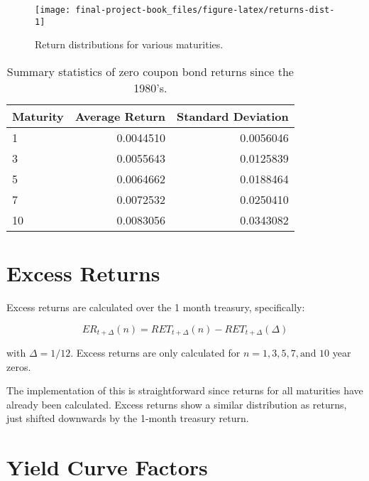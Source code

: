 \documentclass[openany]{book}
\theoremstyle{definition}
\theoremstyle{definition}
\theoremstyle{definition}
\theoremstyle{remark}
\begin{document}
\small

\begin{figure}[H]

{\centering \texttt{[image: final-project-book\_files/figure-latex/returns-dist-1]} 

}

\caption{Return distributions for various maturities.}\label{fig:returns-dist}
\end{figure}

\normalsize

\small

\begin{table}[H]

\caption{\label{tab:returns-summary}Summary statistics of zero coupon bond returns since the 1980's.}
\centering
\begin{tabular}[t]{lrr}
\toprule
Maturity & Average Return & Standard Deviation\\
\midrule
1 & 0.0044510 & 0.0056046\\
3 & 0.0055643 & 0.0125839\\
5 & 0.0064662 & 0.0188464\\
7 & 0.0072532 & 0.0250410\\
10 & 0.0083056 & 0.0343082\\
\bottomrule
\end{tabular}
\end{table}

\normalsize

\hypertarget{excess-returns}{%
\section{Excess Returns}\label{excess-returns}}

Excess returns are calculated over the 1 month treasury, specifically:

\[ ER_{t+\Delta}(n) = RET_{t+\Delta}(n) - RET_{t+\Delta}(\Delta) \]

with \(\Delta = 1 / 12\). Excess returns are only calculated for
\(n = 1, 3, 5, 7, \text{and } 10\) year zeros.

The implementation of this is straightforward since returns for all
maturities have already been calculated. Excess returns show a similar
distribution as returns, just shifted downwards by the 1-month treasury
return.

\hypertarget{yield-curve-factors}{%
\section{Yield Curve Factors}\label{yield-curve-factors}}
\end{document}
